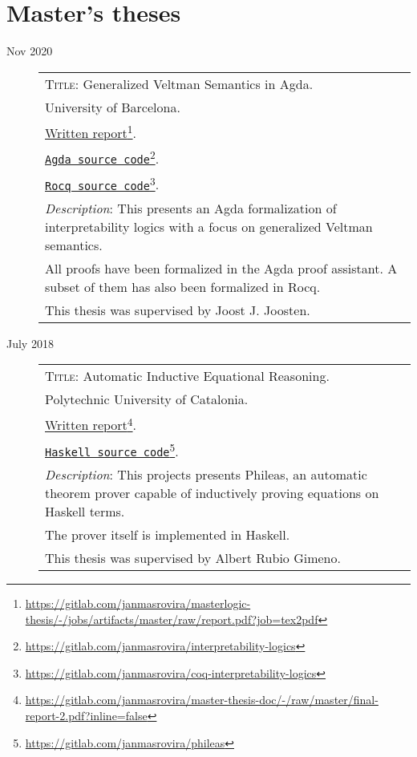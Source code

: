 \documentclass[11pt]{article}
\newcommand{\fnlink}[2]{\href{#1}{#2}\footnote{\url{#1}}}
\begin{document}
\section{Master's theses}

\begin{description}
\item[Nov 2020]
\begin{minipage}{\textwidth}

  \begin{tabular}{|p{12cm}}

    \textsc{Title}: Generalized Veltman Semantics in Agda. \\
    University of Barcelona. \\
    \fnlink{https://gitlab.com/janmasrovira/masterlogic-thesis/-/jobs/artifacts/master/raw/report.pdf?job=tex2pdf}{Written report}. \\
    \fnlink{https://gitlab.com/janmasrovira/interpretability-logics}{\texttt{Agda source code}}. \\
    \fnlink{https://gitlab.com/janmasrovira/coq-interpretability-logics}{\texttt{Rocq source code}}. \\
    \textit{Description}: This presents an Agda formalization of interpretability logics with a focus on generalized Veltman semantics.
    \\All proofs have been formalized in the Agda proof assistant. A subset of them has also been formalized in Rocq.
    \\This thesis was supervised by Joost J. Joosten.

  \end{tabular}
\end{minipage}

\item[July 2018]
  \begin{minipage}{\textwidth}
    \begin{tabular}{|p{12cm}}
      \textsc{Title}: Automatic Inductive Equational Reasoning. \\
      Polytechnic University of Catalonia. \\
      \fnlink{https://gitlab.com/janmasrovira/master-thesis-doc/-/raw/master/final-report-2.pdf?inline=false}{Written report}. \\
      \fnlink{https://gitlab.com/janmasrovira/phileas}{\texttt{Haskell source code}}. \\
      \textit{Description}: This projects presents Phileas, an automatic
      theorem prover capable of inductively proving equations on Haskell
      terms.
      \\The prover itself is implemented in Haskell.
      \\This thesis was supervised by Albert Rubio Gimeno.

    \end{tabular}
  \end{minipage}

\end{description}
\end{document}
